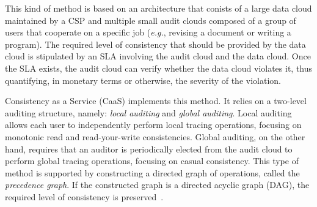 This {\al kind of method is based on an architecture that %
conists of} a large data cloud maintained by a {\al CSP}
and multiple small audit clouds composed of a group of users that cooperate on a specific job ({\it e.g.}, {\al revising} a document or {\al writing} a program). The required level of consistency that should be provided by the data cloud is stipulated by {\al an SLA} 
involving the audit cloud and the data cloud. Once the SLA exists, the audit cloud can verify whether the data cloud violates {\al it}, thus quantifying, in monetary terms or otherwise, the severity of the violation.

Consistency as a Service (CaaS) \cite{liu2014consistency} implements this method. It relies on a two-level auditing structure, name\-ly: \textit{local auditing} and \textit{global auditing}. Local auditing allows each user to independently perform local tracing operations, focusing on monotonic read and read-your-write consistencies. Global auditing, on the other hand, requires that an auditor is periodically elected from the audit cloud to perform global tracing operations, focusing on casual consistency. This type of method is supported by constructing a directed graph of operations, called the \textit{precedence graph}. If the constructed graph is a directed acyclic graph (DAG), the required level of consistency is preserved~\cite{liu2014consistency}.



